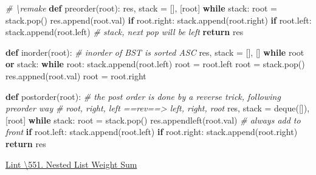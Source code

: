 \documentclass[
]{article}
\newenvironment{Shaded}{}{}
\newcommand{\CommentTok}[1]{\textcolor[rgb]{0.38,0.63,0.69}{\textit{#1}}}
\newcommand{\ControlFlowTok}[1]{\textcolor[rgb]{0.00,0.44,0.13}{\textbf{#1}}}
\newcommand{\KeywordTok}[1]{\textcolor[rgb]{0.00,0.44,0.13}{\textbf{#1}}}
\newcommand{\NormalTok}[1]{#1}
\newcommand{\OperatorTok}[1]{\textcolor[rgb]{0.40,0.40,0.40}{#1}}
\begin{document}
\begin{Shaded}
\begin{Highlighting}[]
\CommentTok{\# \textbackslash{}remake }
\KeywordTok{def}\NormalTok{ preorder(root):}
\NormalTok{  res, stack }\OperatorTok{=}\NormalTok{ [], [root]}
  \ControlFlowTok{while}\NormalTok{ stack:}
\NormalTok{    root }\OperatorTok{=}\NormalTok{ stack.pop()}
\NormalTok{    res.append(root.val)}
    \ControlFlowTok{if}\NormalTok{ root.right: stack.append(root.right)}
    \ControlFlowTok{if}\NormalTok{ root.left:  stack.append(root.left)  }\CommentTok{\# stack, next pop will be left}
  \ControlFlowTok{return}\NormalTok{ res}

\KeywordTok{def}\NormalTok{ inorder(root):  }\CommentTok{\# inorder of BST is sorted ASC}
\NormalTok{  res, stack }\OperatorTok{=}\NormalTok{ [], []}
	\ControlFlowTok{while}\NormalTok{ root }\KeywordTok{or}\NormalTok{ stack:}
    \ControlFlowTok{while}\NormalTok{ root: }
\NormalTok{      stack.append(root.left)}
\NormalTok{      root }\OperatorTok{=}\NormalTok{ root.left}
\NormalTok{	root }\OperatorTok{=}\NormalTok{ stack.pop()}
\NormalTok{  res.appned(root.val)}
\NormalTok{  root }\OperatorTok{=}\NormalTok{ root.right}

\KeywordTok{def}\NormalTok{ postorder(root):  }
  \CommentTok{\# the post order is done by a reverse trick, following preorder way}
  \CommentTok{\# root, right, left ==rev==\textgreater{} left, right, root}
\NormalTok{  res, stack }\OperatorTok{=}\NormalTok{ deque([]), [root]}
  \ControlFlowTok{while}\NormalTok{ stack:}
\NormalTok{    root }\OperatorTok{=}\NormalTok{ stack.pop()}
\NormalTok{    res.appendleft(root.val)  }\CommentTok{\# always add to front}
    \ControlFlowTok{if}\NormalTok{ root.left: stack.append(root.left)}
    \ControlFlowTok{if}\NormalTok{ root.right: stack.append(root.right)}
  \ControlFlowTok{return}\NormalTok{ res}
\end{Highlighting}
\end{Shaded}

\href{https://www.lintcode.com/problem/nested-list-weight-sum/description}{Lint
\textbackslash551. Nested List Weight Sum}
\end{document}
